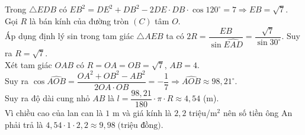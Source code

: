 \begin{ex}
{		Trong $\triangle EDB$ có $EB^2=DE^2+DB^2-2DE\cdot DB\cdot \cos 120^\circ=7 \Rightarrow EB=\sqrt{7}$.\\
		Gọi $R$ là bán kính của đường tròn $(C)$ tâm $O$.\\
		Áp dụng định lý sin trong tam giác $\triangle AEB$ ta có $2R=\dfrac{EB}{\sin \widehat{EAD}}=\dfrac{\sqrt{7}}{\sin 30^\circ}$. Suy ra $R=\sqrt{7}$.\\
		Xét tam giác $OAB$ có $R=OA=OB=\sqrt{7}$, $AB=4$.\\
		Suy ra $\cos \widehat{AOB}=\dfrac{OA^2+OB^2-AB^2}{2OA\cdot OB}=-\dfrac{1}{7}\Rightarrow\widehat{AOB}\approx 98{,}21^\circ$.\\
		Suy ra độ dài cung nhỏ $AB$ là $l=\dfrac{98{,}21}{180}\cdot \pi\cdot R\approx 4{,}54$ (m).\\
		Vì chiều cao của lan can là $1$ m và giá kính là $2{,}2$ triệu/m$^2$ nên số tiền ông An phải trả là
		$4{,}54\cdot 1\cdot2{,2}\approx 9{,}98 \;\text{(triệu đồng).}$
	}
\end{ex}
